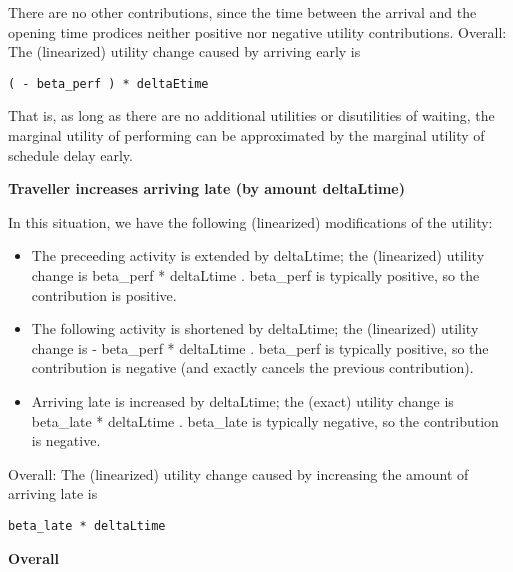 \documentclass[a4paper,11pt]{report}
\begin{document}
There are no other contributions, since the time between the  arrival and the opening time prodices neither positive nor negative  utility contributions. Overall: The (linearized) utility change  caused by arriving early is
\begin{verbatim}
( - beta_perf ) * deltaEtime

\end{verbatim}That is, as long as there are no  additional utilities or disutilities of waiting, the marginal utility of  performing can be approximated by the marginal utility of schedule  delay early.

\textbf{Traveller increases arriving late (by amount deltaLtime)}

In this situation, we have the following (linearized) modifications of the utility:
\begin{itemize}
	\item The preceeding activity is extended by deltaLtime; the  (linearized) utility change is beta\_perf * deltaLtime . beta\_perf  is typically positive, so the contribution is positive.
	\item The following activity is shortened by deltaLtime; the (linearized)  utility change is - beta\_perf * deltaLtime . beta\_perf is  typically positive, so the contribution is negative (and exactly cancels  the previous contribution).
	\item Arriving late is increased by deltaLtime; the (exact) utility change  is beta\_late * deltaLtime . beta\_late is typically negative, so  the contribution is negative.
\end{itemize}

Overall: The (linearized) utility change caused by increasing the amount of arriving late is
\begin{verbatim}
beta_late * deltaLtime

\end{verbatim}

\textbf{Overall}
\end{document}
